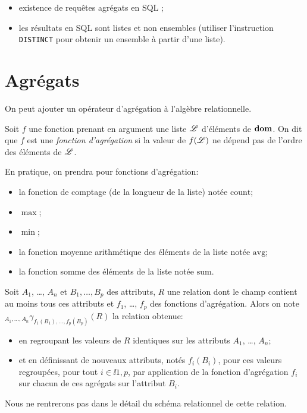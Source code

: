 \begin{itemize}
\item existence de requêtes agrégats en SQL ;
\item les résultats en SQL sont listes et non ensembles (utiliser l'instruction \texttt{DISTINCT} pour obtenir un ensemble à partir d'une liste).
\end{itemize}

\section{Agrégats}

On peut ajouter un opérateur d'agrégation à l'algèbre relationnelle.


\begin{defi}
  Soit $f$ une fonction prenant en argument une liste $\mathscr{L}$ d'éléments
  de $\mathbf{dom}$. On dit que $f$ est une \emph{fonction d'agrégation} si la
  valeur de $f(\mathscr{L})$ ne dépend pas de l'ordre des éléments de $\mathscr{L}$.
\end{defi}
En pratique, on prendra pour fonctions d'agrégation:
\begin{itemize}
\item la fonction de comptage (de la longueur de la liste) notée $\mathrm{count}$;
\item $\max$;
\item $\min$;
\item la fonction moyenne arithmétique des éléments de la liste notée $\mathrm{avg}$;
\item la fonction somme des éléments de la liste notée $\mathrm{sum}$.
\end{itemize}
\begin{defi}
  Soit $A_{1}$, \ldots{}, $A_{n}$ et $B_{1}, \ldots,B_{p}$ des
  attributs, $R$ une relation dont le champ contient au moins tous
  ces attributs et $f_{1}$, \ldots{}, $f_{p}$ des fonctions d'agrégation.
  Alors on note
  ${}_{A_{1},\ldots,A_{n}}\gamma_{f_1(B_{1}),\ldots,f_p(B_{p})}(R)$ la relation
  obtenue:
  \begin{itemize}
  \item en regroupant les valeurs de $R$ identiques sur les attributs
    $A_{1}$, \ldots{}, $A_{n}$;
  \item et en définissant de nouveaux attributs, notés $f_{i}(B_{i})$,
    pour ces valeurs regroupées, pour tout $i\in\ii{1,p}$, par
    application de la fonction d'agrégation $f_{i}$ sur chacun de ces
    agrégats sur l'attribut $B_{i}$.
  \end{itemize}
\end{defi}
\begin{rem}
  Nous ne rentrerons pas dans le détail du schéma relationnel de cette relation. 
\end{rem}


